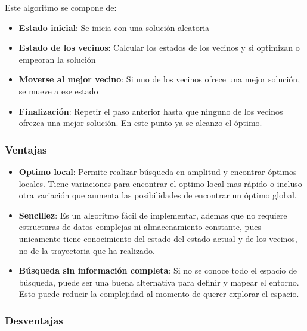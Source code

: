 \documentclass[12pt,twoside]{article}
\begin{document}
	Este algoritmo se compone de:
	\begin{itemize}
		\item \textbf{Estado inicial}: Se inicia con una solución aleatoria
		\item \textbf{Estado de los vecinos}: Calcular los estados de los vecinos y si optimizan o empeoran la solución
		\item \textbf{Moverse al mejor vecino}: Si uno de los vecinos ofrece una mejor solución, se mueve a ese estado
		\item \textbf{Finalización}: Repetir el paso anterior hasta que ninguno de los vecinos ofrezca una mejor solución. En este punto ya se alcanzo el óptimo.
	\end{itemize}
	
	\subsubsection{Ventajas}
	
	\begin{itemize}
		\item \textbf{Optimo local}: Permite realizar búsqueda en amplitud y encontrar óptimos locales. Tiene variaciones para encontrar el optimo local mas rápido o incluso otra variación que aumenta las posibilidades de encontrar un óptimo global.
		
		\item \textbf{Sencillez}: Es un algoritmo fácil de implementar, ademas que no requiere estructuras de datos complejas ni almacenamiento constante, pues unicamente tiene conocimiento del estado del estado actual y de los vecinos, no de la trayectoria que ha realizado.
		
		\item \textbf{Búsqueda sin información completa}: Si no se conoce todo el espacio de búsqueda, puede ser una buena alternativa para definir y mapear el entorno. Esto puede reducir la complejidad al momento de querer explorar el espacio.
	\end{itemize}
	
	
	\subsubsection{Desventajas}
	
\end{document}
